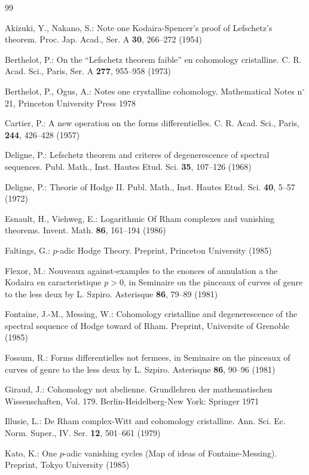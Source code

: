 \documentclass[12pt,a4paper]{article}
\theoremstyle{plain}
\theoremstyle{definition}
\theoremstyle{remark}
\begin{document}
\begin{thebibliography}{99}

 Akizuki, Y., Nakano, S.: Note one Kodaira-Spencer's proof of Lefschetz's theorem. Proc. Jap. Acad., Ser. A \textbf{30}, 266--272 (1954)

 Berthelot, P.: On the ``Lefschetz theorem faible'' en cohomology cristalline. C. R. Acad. Sci., Paris, Ser. A \textbf{277}, 955--958 (1973)

 Berthelot, P., Ogus, A.: Notes one crystalline cohomology. Mathematical Notes n$^\circ$ 21, Princeton University Press 1978

 Cartier, P.: A new operation on the forms differentielles. C. R. Acad. Sci., Paris, \textbf{244}, 426--428 (1957)

 Deligne, P.: Lefschetz theorem and criteres of degenerescence of spectral sequences. Publ. Math., Inst. Hautes Etud. Sci. \textbf{35}, 107--126 (1968)

 Deligne, P.: Theorie of Hodge II. Publ. Math., Inst. Hautes Etud. Sci. \textbf{40}, 5--57 (1972)

 Esnault, H., Viehweg, E.: Logarithmic Of Rham complexes and vanishing theorems. Invent. Math. \textbf{86}, 161--194 (1986)

 Faltings, G.: $p$-adic Hodge Theory. Preprint, Princeton University (1985)

 Flexor, M.: Nouveaux against-examples to the enonces of annulation a the Kodaira en caracteristique $p > 0$, in Seminaire on the pinceaux of curves of genre to the less deux by L. Szpiro. Asterisque \textbf{86}, 79--89 (1981)

 Fontaine, J.-M., Messing, W.: Cohomology cristalline and degenerescence of the spectral sequence of Hodge toward of Rham. Preprint, Universite of Grenoble (1985)

 Fossum, R.: Forms differentielles not fermees, in Seminaire on the pinceaux of curves of genre to the less deux by L. Szpiro. Asterisque \textbf{86}, 90--96 (1981)

 Giraud, J.: Cohomology not abelienne. Grundlehren der mathematischen Wissenschaften, Vol. 179. Berlin-Heidelberg-New York: Springer 1971

 Illusie, L.: De Rham complex-Witt and cohomology cristalline. Ann. Sci. Ec. Norm. Super., IV. Ser. \textbf{12}, 501--661 (1979)

 Kato, K.: One $p$-adic vanishing cycles (Map of ideas of Fontaine-Messing). Preprint, Tokyo University (1985)


\end{thebibliography}
\end{document}
